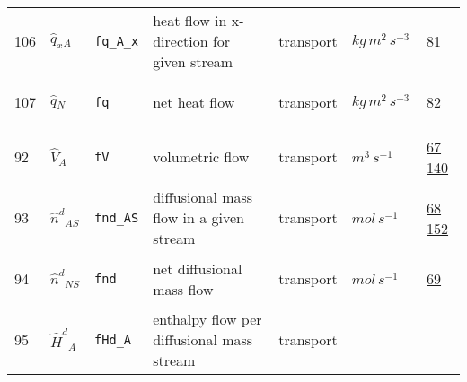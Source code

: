\begin{longtable}{|p{1cm}|p{2.5cm}|p{4.5cm}|p{8cm}|p{3.0cm}|p{3cm}|p{1cm}|}
                 \\
            106
             & \hypertarget{"v:106"}{ $ {{\hat{q}_{x}}}{_{A}} $}
             & \verb|fq_A_x|
             & heat flow in x-direction for given stream
             & \begin{lay}transport \end{lay}
             & $ kg \,m^{2} \,s^{-3} \, $
             &                 \hyperlink{"e:81"}{ 81 }
                 \\
            107
             & \hypertarget{"v:107"}{ $ {{\hat{q}}}{_{N}} $}
             & \verb|fq|
             & net heat flow
             & \begin{lay}transport \end{lay}
             & $ kg \,m^{2} \,s^{-3} \, $
             &                 \hyperlink{"e:82"}{ 82 }
                 \\
            92
             & \hypertarget{"v:92"}{ $ {\hat{V}}{_{A}} $}
             & \verb|fV|
             & volumetric flow
             & \begin{lay}transport \end{lay}
             & $ m^{3} \,s^{-1} \, $
             &                 \hyperlink{"e:67"}{ 67 }
                                 \hyperlink{"e:140"}{ 140 }
                 \\
            93
             & \hypertarget{"v:93"}{ $ {{\hat{n}^{d}}}{_{{A S}}} $}
             & \verb|fnd_AS|
             & diffusional mass flow in a given stream
             & \begin{lay}transport \end{lay}
             & $ mol \,s^{-1} \, $
             &                 \hyperlink{"e:68"}{ 68 }
                                 \hyperlink{"e:152"}{ 152 }
                 \\
            94
             & \hypertarget{"v:94"}{ $ {{\hat{n}^{d}}}{_{{N S}}} $}
             & \verb|fnd|
             & net diffusional mass flow
             & \begin{lay}transport \end{lay}
             & $ mol \,s^{-1} \, $
             &                 \hyperlink{"e:69"}{ 69 }
                 \\
            95
             & \hypertarget{"v:95"}{ $ {{\hat{H}^d}}{_{A}} $}
             & \verb|fHd_A|
             & enthalpy flow per diffusional mass stream
             & \begin{lay}transport \end{lay}

\end{longtable}
